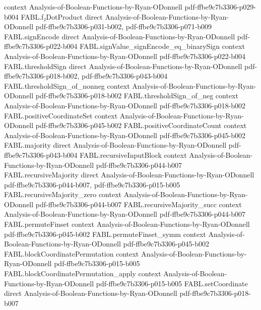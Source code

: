 \begin{theorem}
  {context}
  {Analysis-of-Boolean-Functions-by-Ryan-ODonnell}
  {pdf-ffbe9c7b3306-p029-b004}
\proofstep
  {FABL.f₂DotProduct}
  {direct}
  {Analysis-of-Boolean-Functions-by-Ryan-ODonnell}
  {pdf-ffbe9c7b3306-p031-b002,
    pdf-ffbe9c7b3306-p071-b009}
\proofstep
  {FABL.signEncode}
  {direct}
  {Analysis-of-Boolean-Functions-by-Ryan-ODonnell}
  {pdf-ffbe9c7b3306-p022-b004}
\proofstep
  {FABL.signValue_signEncode_eq_binarySign}
  {context}
  {Analysis-of-Boolean-Functions-by-Ryan-ODonnell}
  {pdf-ffbe9c7b3306-p022-b004}
\proofstep
  {FABL.thresholdSign}
  {direct}
  {Analysis-of-Boolean-Functions-by-Ryan-ODonnell}
  {pdf-ffbe9c7b3306-p018-b002,
    pdf-ffbe9c7b3306-p043-b004}
\proofstep
  {FABL.thresholdSign_of_nonneg}
  {context}
  {Analysis-of-Boolean-Functions-by-Ryan-ODonnell}
  {pdf-ffbe9c7b3306-p018-b002}
\proofstep
  {FABL.thresholdSign_of_neg}
  {context}
  {Analysis-of-Boolean-Functions-by-Ryan-ODonnell}
  {pdf-ffbe9c7b3306-p018-b002}
\proofstep
  {FABL.positiveCoordinateSet}
  {context}
  {Analysis-of-Boolean-Functions-by-Ryan-ODonnell}
  {pdf-ffbe9c7b3306-p045-b002}
\proofstep
  {FABL.positiveCoordinateCount}
  {context}
  {Analysis-of-Boolean-Functions-by-Ryan-ODonnell}
  {pdf-ffbe9c7b3306-p045-b002}
\proofstep
  {FABL.majority}
  {direct}
  {Analysis-of-Boolean-Functions-by-Ryan-ODonnell}
  {pdf-ffbe9c7b3306-p043-b004}
\proofstep
  {FABL.recursiveInputBlock}
  {context}
  {Analysis-of-Boolean-Functions-by-Ryan-ODonnell}
  {pdf-ffbe9c7b3306-p044-b007}
\proofstep
  {FABL.recursiveMajority}
  {direct}
  {Analysis-of-Boolean-Functions-by-Ryan-ODonnell}
  {pdf-ffbe9c7b3306-p044-b007,
    pdf-ffbe9c7b3306-p015-b005}
\proofstep
  {FABL.recursiveMajority_zero}
  {context}
  {Analysis-of-Boolean-Functions-by-Ryan-ODonnell}
  {pdf-ffbe9c7b3306-p044-b007}
\proofstep
  {FABL.recursiveMajority_succ}
  {context}
  {Analysis-of-Boolean-Functions-by-Ryan-ODonnell}
  {pdf-ffbe9c7b3306-p044-b007}
\proofstep
  {FABL.permuteFinset}
  {context}
  {Analysis-of-Boolean-Functions-by-Ryan-ODonnell}
  {pdf-ffbe9c7b3306-p045-b002}
\proofstep
  {FABL.permuteFinset_symm}
  {context}
  {Analysis-of-Boolean-Functions-by-Ryan-ODonnell}
  {pdf-ffbe9c7b3306-p045-b002}
\proofstep
  {FABL.blockCoordinatePermutation}
  {context}
  {Analysis-of-Boolean-Functions-by-Ryan-ODonnell}
  {pdf-ffbe9c7b3306-p015-b005}
\proofstep
  {FABL.blockCoordinatePermutation_apply}
  {context}
  {Analysis-of-Boolean-Functions-by-Ryan-ODonnell}
  {pdf-ffbe9c7b3306-p015-b005}
\proofstep
  {FABL.setCoordinate}
  {direct}
  {Analysis-of-Boolean-Functions-by-Ryan-ODonnell}
  {pdf-ffbe9c7b3306-p018-b007}

\end{theorem}
